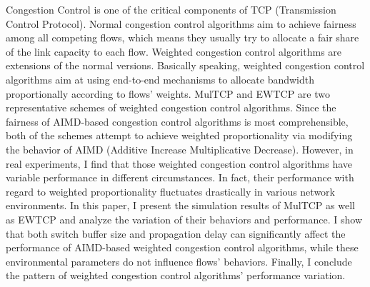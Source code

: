 \documentclass[winfonts]{njuthesis}
\begin{document}
\begin{englishabstract}
  Congestion Control is one of the critical components of TCP (Transmission Control Protocol). Normal congestion control algorithms aim to achieve fairness among all competing flows, which means they usually try to allocate a fair share of the link capacity to each flow. Weighted congestion control algorithms are extensions of the normal versions. Basically speaking, weighted congestion control algorithms aim at using end-to-end mechanisms to allocate bandwidth proportionally according to flows’ weights. MulTCP and EWTCP are two representative schemes of weighted congestion control algorithms. Since the fairness of AIMD-based congestion control algorithms is most comprehensible, both of the schemes attempt to achieve weighted proportionality via modifying the behavior of AIMD (Additive Increase Multiplicative Decrease). However, in real experiments, I find that those weighted congestion control algorithms have variable performance in different circumstances. In fact, their performance with regard to weighted proportionality fluctuates drastically in various network environments. In this paper, I present the simulation results of MulTCP as well as EWTCP and analyze the variation of their behaviors and performance. I show that both switch buffer size and propagation delay can significantly affect the performance of AIMD-based weighted congestion control algorithms, while these environmental parameters do not influence flows’ behaviors. Finally, I conclude the pattern of weighted congestion control algorithms’ performance variation. 
\end{englishabstract}

%



\end{document}
